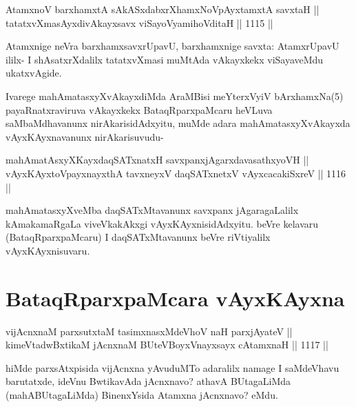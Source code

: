 
\begin{shl}
AtamxnoV barxhamxtA sAkASxdabxrXhamxNoV\s pAyxtamxtA savxtaH ||  \\
tatatxvXmasAyxdivAkayxsavx viSayoV\s yamihoVditaH \hfill || 1115 || 
\end{shl}

\begin{artha}
Atamxnige neVra barxhamxsavxrUpavU, barxhamxnige savxta: AtamxrUpavU ililx- I shAsatxrXdalilx tatatxvXmasi muMtAda vAkayxkekx viSayaveMdu ukatxvAgide.
\end{artha}

\begin{artha}
Ivarege mahAmatasxyXvAkayxdiMda AraMBisi meYterxVyiV bArxhamxNa(5) payaRnatxraviruva vAkayxkekx BataqRparxpaMcaru heVLuva saMbaMdhavanunx nirAkarisidAdxyitu, muMde adara mahAmatasxyXvAkayxda vAyxKAyxnavanunx nirAkarisuvudu-
\end{artha}

\begin{shl}
mahAmatAsxyXKayxdaqSATxnatxH savxpanxjAgarxdavasathxyoVH || \\
vAyxKAyxtoV\s payxnayxthA tavxneyxV daqSATxnetxV vAyxcacakiSxreV \hfill || 1116 ||  
\end{shl}

\begin{artha}
mahAmatasxyXveMba daqSATxMtavanunx savxpanx jAgaragaLalilx kAmakamaRgaLa viveVkakAkxgi vAyxKAyxnisidAdxyitu. beVre kelavaru (BataqRparxpaMcaru) I daqSATxMtavanunx beVre riVtiyalilx vAyxKAyxnisuvaru.
\end{artha}

\section*{BataqRparxpaMcara vAyxKAyxna}



\begin{shl}
vijAcnxnaM parxsutxtaM tasimxnasxMdeVhoV naH parxjAyateV || \\
kimeVtadwBxtikaM jAcnxnaM BUteVBoyxV\s nayxsayx cA\s \s tamxnaH \hfill || 1117 ||  
\end{shl}

\begin{artha}
hiMde parxsAtxpisida vijAcnxna yAvuduMTo adaralilx namage I saMdeVhavu barutatxde, ideVnu BwtikavAda jAcnxnavo? athavA BUtagaLiMda (mahABUtagaLiMda) BinenxYsida Atamxna jAcnxnavo? eMdu.
\end{artha}

